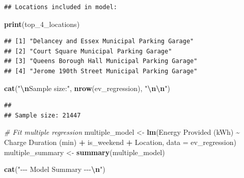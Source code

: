 \documentclass[
  12pt,
]{article}
\newenvironment{Shaded}{\begin{snugshade}}{\end{snugshade}}
\newcommand{\AttributeTok}[1]{\textcolor[rgb]{0.13,0.29,0.53}{#1}}
\newcommand{\CommentTok}[1]{\textcolor[rgb]{0.56,0.35,0.01}{\textit{#1}}}
\newcommand{\FunctionTok}[1]{\textcolor[rgb]{0.13,0.29,0.53}{\textbf{#1}}}
\newcommand{\NormalTok}[1]{#1}
\newcommand{\OtherTok}[1]{\textcolor[rgb]{0.56,0.35,0.01}{#1}}
\newcommand{\SpecialCharTok}[1]{\textcolor[rgb]{0.81,0.36,0.00}{\textbf{#1}}}
\newcommand{\StringTok}[1]{\textcolor[rgb]{0.31,0.60,0.02}{#1}}
\begin{document}
\begin{verbatim}
## Locations included in model:
\end{verbatim}

\begin{Shaded}
\begin{Highlighting}[]
\FunctionTok{print}\NormalTok{(top\_4\_locations)}
\end{Highlighting}
\end{Shaded}

\begin{verbatim}
## [1] "Delancey and Essex Municipal Parking Garage" 
## [2] "Court Square Municipal Parking Garage"       
## [3] "Queens Borough Hall Municipal Parking Garage"
## [4] "Jerome 190th Street Municipal Parking Garage"
\end{verbatim}

\begin{Shaded}
\begin{Highlighting}[]
\FunctionTok{cat}\NormalTok{(}\StringTok{"}\SpecialCharTok{\textbackslash{}n}\StringTok{Sample size:"}\NormalTok{, }\FunctionTok{nrow}\NormalTok{(ev\_regression), }\StringTok{"}\SpecialCharTok{\textbackslash{}n\textbackslash{}n}\StringTok{"}\NormalTok{)}
\end{Highlighting}
\end{Shaded}

\begin{verbatim}
## 
## Sample size: 21447
\end{verbatim}

\begin{Shaded}
\begin{Highlighting}[]
\CommentTok{\# Fit multiple regression}
\NormalTok{multiple\_model }\OtherTok{\textless{}{-}} \FunctionTok{lm}\NormalTok{(}\StringTok{\textasciigrave{}}\AttributeTok{Energy Provided (kWh)}\StringTok{\textasciigrave{}} \SpecialCharTok{\textasciitilde{}} \StringTok{\textasciigrave{}}\AttributeTok{Charge Duration (min)}\StringTok{\textasciigrave{}} \SpecialCharTok{+}
\NormalTok{    is\_weekend }\SpecialCharTok{+}\NormalTok{ Location, }\AttributeTok{data =}\NormalTok{ ev\_regression)}
\NormalTok{multiple\_summary }\OtherTok{\textless{}{-}} \FunctionTok{summary}\NormalTok{(multiple\_model)}

\FunctionTok{cat}\NormalTok{(}\StringTok{"{-}{-}{-} Model Summary {-}{-}{-}}\SpecialCharTok{\textbackslash{}n}\StringTok{"}\NormalTok{)}
\end{Highlighting}
\end{Shaded}
\end{document}

